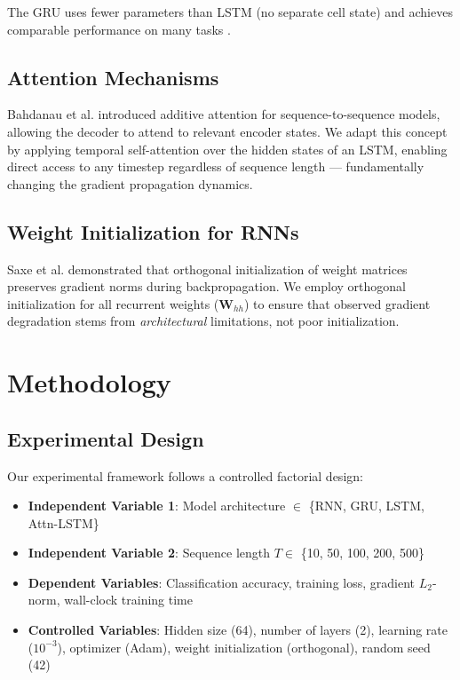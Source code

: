 \documentclass[12pt, a4paper]{article}
\begin{document}
The GRU uses fewer parameters than LSTM (no separate cell state) and achieves comparable performance on many tasks \cite{chung2014}.

\subsection{Attention Mechanisms}

Bahdanau et al. \cite{bahdanau2015} introduced additive attention for sequence-to-sequence models, allowing the decoder to attend to relevant encoder states. We adapt this concept by applying temporal self-attention over the hidden states of an LSTM, enabling direct access to any timestep regardless of sequence length — fundamentally changing the gradient propagation dynamics.

\subsection{Weight Initialization for RNNs}

Saxe et al. \cite{saxe2014} demonstrated that orthogonal initialization of weight matrices preserves gradient norms during backpropagation. We employ orthogonal initialization for all recurrent weights ($\mathbf{W}_{hh}$) to ensure that observed gradient degradation stems from \textit{architectural} limitations, not poor initialization.


\section{Methodology}

\subsection{Experimental Design}

Our experimental framework follows a controlled factorial design:

\begin{itemize}[leftmargin=2em]
    \item \textbf{Independent Variable 1}: Model architecture $\in$ \{RNN, GRU, LSTM, Attn-LSTM\}
    \item \textbf{Independent Variable 2}: Sequence length $T \in$ \{10, 50, 100, 200, 500\}
    \item \textbf{Dependent Variables}: Classification accuracy, training loss, gradient $L_2$-norm, wall-clock training time
    \item \textbf{Controlled Variables}: Hidden size (64), number of layers (2), learning rate ($10^{-3}$), optimizer (Adam), weight initialization (orthogonal), random seed (42)
\end{itemize}
\end{document}
